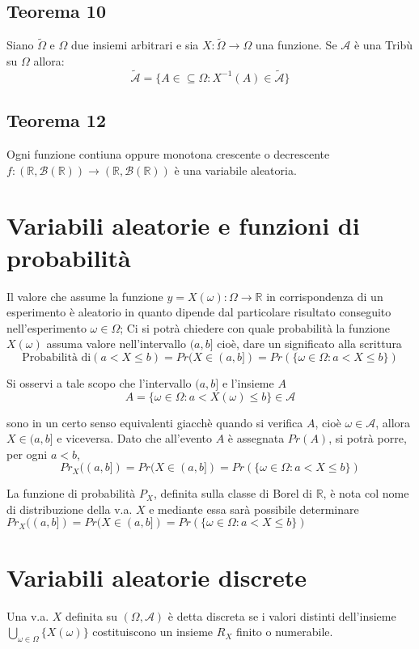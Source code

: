 \documentclass[a4paper]{report}
\begin{document}
  \subsection{Teorema 10}
  Siano $\tilde{\Omega}$ e $\Omega$ due insiemi arbitrari e sia $X: \tilde{\Omega} \rightarrow \Omega$ una funzione. Se $\mathcal{A}$ è una Tribù su $\Omega$ allora:
  $$ \tilde{\mathcal{A}} = \{ A \in \subseteq \Omega: X^{-1}(A) \in \tilde{\mathcal{A}}\} $$

  \subsection{Teorema 12}
  Ogni funzione contiuna oppure monotona crescente o decrescente $f:(\mathbb{R},\mathcal{B}(\mathbb{R})) \rightarrow (\mathbb{R},\mathcal{B}(\mathbb{R})) $ è una variabile aleatoria.

  \section{Variabili aleatorie e funzioni di probabilità}
  Il valore che assume la funzione $y = X(\omega): \Omega \rightarrow \mathbb{R}$ in corrispondenza di un esperimento è aleatorio in quanto dipende dal particolare risultato conseguito nell'esperimento \(\omega \in \Omega\); Ci si potrà chiedere con quale probabilità la funzione $X(\omega)$ assuma valore nell'intervallo $(a,b]$ cioè, dare un significato alla scrittura
  \[ \text{Probabilità di} (a < X \leqslant b) = Pr(X \in (a,b]) = Pr(\{ \omega \in \Omega : a < X \leqslant b \}) \]

  Si osservi a tale scopo che l'intervallo $(a,b]$ e l'insieme $A$
  \[ A = \{ \omega \in \Omega : a < X(\omega) \leq b\} \in \mathcal{A} \]

  sono in un certo senso equivalenti giacchè quando si verifica $A$, cioè $\omega \in \mathcal{A}$, allora $X \in (a,b]$ e viceversa. Dato che all'evento $A$ è assegnata $Pr(A)$, si potrà porre, per ogni $a<b$,
  \[ Pr_X((a,b]) = Pr(X \in (a,b]) = Pr(\{ \omega \in \Omega : a < X \leqslant b \})\]

  La funzione di probabilità $P_X$, definita sulla classe di Borel di $\mathbb{R}$, è nota col nome di distribuzione della v.a. $X$ e mediante essa sarà possibile determinare \\
  $Pr_X((a,b]) = Pr(X \in (a,b]) = Pr(\{ \omega \in \Omega : a < X \leqslant b \})$


  \section{Variabili aleatorie discrete}
  Una v.a. $X$ definita su $(\Omega, \mathcal{A})$ è detta discreta se i valori distinti dell'insieme $\bigcup_{\omega \in \Omega} \{ {X(\omega)} \}$ costituiscono un insieme $R_X$ finito o numerabile.
\end{document}
